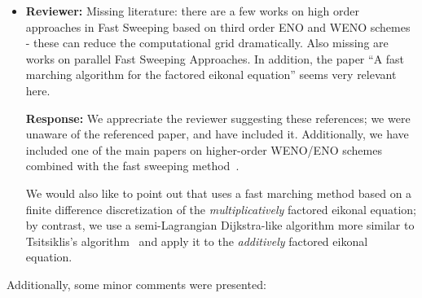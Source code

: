 \documentclass{article}
\begin{document}
\begin{itemize}
\item \textbf{Reviewer:} Missing literature: there are a few works on
  high order approaches in Fast Sweeping based on third order ENO and
  WENO schemes - these can reduce the computational grid
  dramatically. Also missing are works on parallel Fast Sweeping
  Approaches. In addition, the paper ``A fast marching algorithm for
  the factored eikonal equation'' seems very relevant here.

  \textbf{Response:} We apprecriate the reviewer suggesting these
  references; we were unaware of the referenced paper, and have
  included it. Additionally, we have included one of the main papers
  on higher-order WENO/ENO schemes combined with the fast sweeping
  method~\cite{zhang2006high}.

  We would also like to point out that \cite{treister2016fast} uses a
  fast marching method based on a finite difference discretization of
  the \emph{multiplicatively} factored eikonal equation; by contrast,
  we use a semi-Lagrangian Dijkstra-like algorithm more similar to
  Tsitsiklis's algorithm~\cite{tsitsiklis1995efficient} and apply it
  to the \emph{additively} factored eikonal equation.

\end{itemize}

Additionally, some minor comments were presented:
\end{document}
